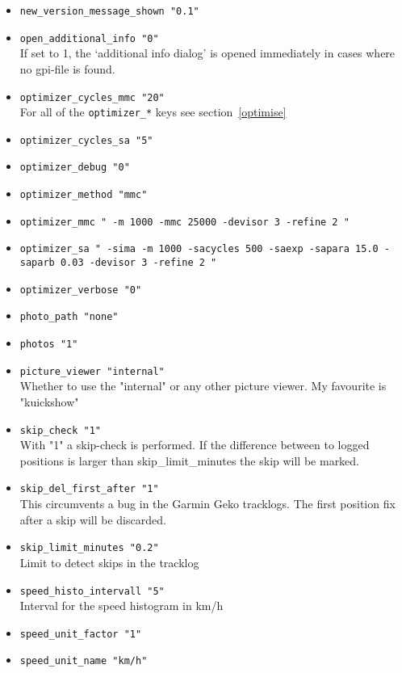\begin{itemize}
\item \texttt{new\_version\_message\_shown    "0.1"}

\item \texttt{open\_additional\_info    "0"}\\
    If set to 1, the `additional info dialog' is opened immediately in cases where no gpi-file is found.


\item \texttt{optimizer\_cycles\_mmc    "20"} \\
	For all of the \texttt{optimizer\_*} keys see section~\ref{optimise}
\item \texttt{optimizer\_cycles\_sa    "5"}
\item \texttt{optimizer\_debug    "0"}
\item \texttt{optimizer\_method    "mmc"}
\item \texttt{optimizer\_mmc    " -m 1000 -mmc 25000 -devisor 3 -refine 2 "}
\item \texttt{optimizer\_sa    " -sima -m 1000 -sacycles 500 -saexp -sapara 15.0 -saparb 0.03 -devisor 3 -refine 2 "}
\item \texttt{optimizer\_verbose    "0"}


\item \texttt{photo\_path    "none"}
\item \texttt{photos    "1"}
\item \texttt{picture\_viewer    "internal"}\\
    Whether to use the "internal" or any other picture viewer. My favourite is "kuickshow"
\item \texttt{skip\_check    "1"}\\
    With "1" a skip-check is performed. If the difference between to logged positions is larger than
    skip\_limit\_minutes the skip will be marked.
\item \texttt{skip\_del\_first\_after    "1"} \\
	This circumvents a bug in the Garmin Geko tracklogs. The first position fix after a skip will be discarded.
\item \texttt{skip\_limit\_minutes    "0.2"}\\
    Limit to detect skips in the tracklog
\item \texttt{speed\_histo\_intervall    "5"}\\
    Interval for the speed histogram in km/h
\item \texttt{speed\_unit\_factor    "1"}
\item \texttt{speed\_unit\_name    "km/h"}


\end{itemize}
